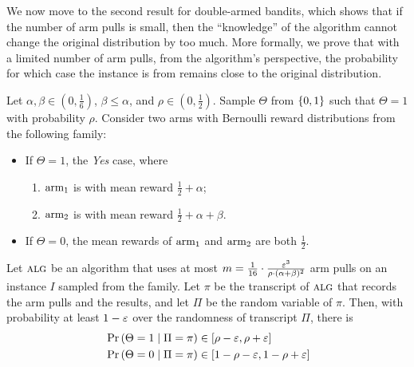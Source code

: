 We now move to the second result for double-armed bandits, which shows that if the number of arm pulls is small, then the ``knowledge'' %
of the algorithm cannot change the original distribution by too much. More formally, we prove that with a limited number of arm pulls, from the algorithm's perspective, the probability for which case the instance is from remains close to the original distribution.
\begin{lemma}
	\label{lem:arm-learn}
	Let $\alpha, \beta \in (0,\frac16)$, $\beta\leq \alpha$, and $\rho \in (0,\frac12)$. Sample $\Theta$ from $\left\{ 0,1 \right\}$ such that $\Theta=1$ with probability $\rho$.
	Consider two arms with Bernoulli reward distributions from the following family:
	\begin{itemize}
		\item If $\Theta=1$, the \emph{Yes} case, where 
		\begin{enumerate}
			\item $\textnormal{arm}_1$ is with mean reward $\frac{1}{2}+\alpha$;
			\item $\textnormal{arm}_2$ is with mean reward $\frac{1}{2}+\alpha+\beta$.
		\end{enumerate}
		\item If $\Theta=0$, the mean rewards of $\textnormal{arm}_1$ and $\textnormal{arm}_2$ are both $\frac{1}{2}$.
	\end{itemize}
	Let $\mbox{\sc alg}$ be an algorithm that uses at most $m=\frac{1}{16}\cdot \frac{\varepsilon^3}{\rho \cdot (\alpha+\beta)^{2}}$ arm pulls on an instance $I$ sampled from the family. Let $\pi$ be the transcript of $\mbox{\sc alg}$ that records the arm pulls and the results, and let $\Pi$ be the random variable of $\pi$. Then, with probability at least $1-\varepsilon$ over the randomness of transcript $\Pi$, there is
	\begin{align*}
		& \operatorname*{\textnormal{Pr}}\left(\Theta=1 \mid \Pi=\pi\right) \in [\rho -  \varepsilon,  \rho +  \varepsilon]\\
		& \operatorname*{\textnormal{Pr}}\left(\Theta=0 \mid \Pi=\pi\right) \in [1-\rho - \varepsilon,  1- \rho + \varepsilon]
	\end{align*}
\end{lemma}


